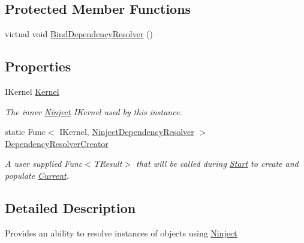 \subsection*{Protected Member Functions}
\begin{DoxyCompactItemize}
\item 
virtual void \hyperlink{classCqrs_1_1Ninject_1_1Configuration_1_1NinjectDependencyResolver_a2b663d936fcded5f679623bf0b0393e6_a2b663d936fcded5f679623bf0b0393e6}{Bind\+Dependency\+Resolver} ()
\end{DoxyCompactItemize}
\subsection*{Properties}
\begin{DoxyCompactItemize}
\item 
I\+Kernel \hyperlink{classCqrs_1_1Ninject_1_1Configuration_1_1NinjectDependencyResolver_a507ba37916f7e77cd5bbcc14543c03b5_a507ba37916f7e77cd5bbcc14543c03b5}{Kernel}
\begin{DoxyCompactList}\small\item\em The inner \hyperlink{namespaceCqrs_1_1Ninject}{Ninject} I\+Kernel used by this instance. \end{DoxyCompactList}\item 
static Func$<$ I\+Kernel, \hyperlink{classCqrs_1_1Ninject_1_1Configuration_1_1NinjectDependencyResolver}{Ninject\+Dependency\+Resolver} $>$ \hyperlink{classCqrs_1_1Ninject_1_1Configuration_1_1NinjectDependencyResolver_a11ea52beeb7420d21c99baeb3501aa0a_a11ea52beeb7420d21c99baeb3501aa0a}{Dependency\+Resolver\+Creator}
\begin{DoxyCompactList}\small\item\em A user supplied Func$<$\+T\+Result$>$ that will be called during \hyperlink{classCqrs_1_1Ninject_1_1Configuration_1_1NinjectDependencyResolver_adc6171ed45679dcbaa67782770ba5083_adc6171ed45679dcbaa67782770ba5083}{Start} to create and populate \hyperlink{classCqrs_1_1Configuration_1_1DependencyResolver_aaede4bbd564000f2becf65e8be863fff_aaede4bbd564000f2becf65e8be863fff}{Current}. \end{DoxyCompactList}\end{DoxyCompactItemize}


\subsection{Detailed Description}
Provides an ability to resolve instances of objects using \hyperlink{namespaceCqrs_1_1Ninject}{Ninject} 




